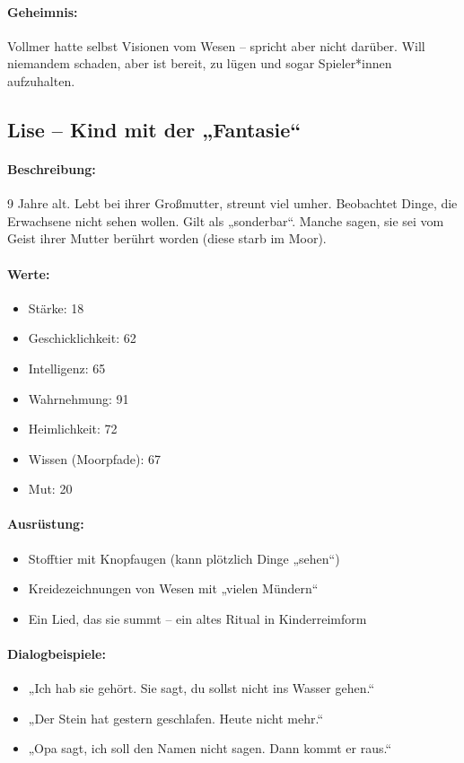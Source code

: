 \paragraph{Geheimnis:}
Vollmer hatte selbst Visionen vom Wesen – spricht aber nicht darüber. Will niemandem schaden, aber ist bereit, zu lügen und sogar Spieler*innen aufzuhalten.
\newpage
\subsection{Lise – Kind mit der „Fantasie“}
\paragraph{Beschreibung:}
9 Jahre alt. Lebt bei ihrer Großmutter, streunt viel umher. Beobachtet Dinge, die Erwachsene nicht sehen wollen. Gilt als „sonderbar“. Manche sagen, sie sei vom Geist ihrer Mutter berührt worden (diese starb im Moor).
\paragraph{Werte:}
\begin{itemize}
\item Stärke: 18
\item Geschicklichkeit: 62
\item Intelligenz: 65
\item Wahrnehmung: 91
\item Heimlichkeit: 72
\item Wissen (Moorpfade): 67
\item Mut: 20
\end{itemize}
\paragraph{Ausrüstung:}
\begin{itemize}
\item Stofftier mit Knopfaugen (kann plötzlich Dinge „sehen“)
\item Kreidezeichnungen von Wesen mit „vielen Mündern“
\item Ein Lied, das sie summt – ein altes Ritual in Kinderreimform
\end{itemize}
\paragraph{Dialogbeispiele:}
\begin{itemize}
\item „Ich hab sie gehört. Sie sagt, du sollst nicht ins Wasser gehen.“
\item „Der Stein hat gestern geschlafen. Heute nicht mehr.“
\item „Opa sagt, ich soll den Namen nicht sagen. Dann kommt er raus.“
\end{itemize}
